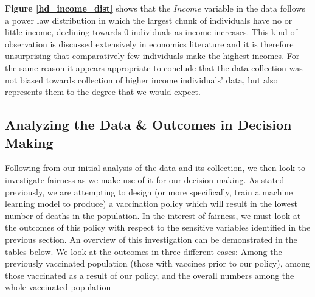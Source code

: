 \documentclass{article}
\begin{document}
\textbf{Figure \ref{hd_income_dist}} shows that the $Income$ variable in the data follows a power law distribution in which the largest chunk of individuals have no or little income, declining towards $0$ individuals as income increases. This kind of observation is discussed extensively in economics literature \textcolor{blue}{\cite{gabaix2016power}} and it is therefore unsurprising that comparatively few individuals make the highest incomes. For the same reason it appears appropriate to conclude that the data collection was not biased towards collection of higher income individuals' data, but also represents them to the degree that we would expect.



\subsection{Analyzing the Data \& Outcomes in Decision Making}

Following from our initial analysis of the data and its collection, we then look to investigate fairness as we make use of it for our decision making. As stated previously, we are attempting to design (or more specifically, train a machine learning model to produce) a vaccination policy which will result in the lowest number of deaths in the population. In the interest of fairness, we must look at the outcomes of this policy with respect to the sensitive variables identified in the previous section. An overview of this investigation can be demonstrated in the tables below. We look at the outcomes in three different cases: Among the previously vaccinated population (those with vaccines prior to our policy), among those vaccinated as a result of our policy, and the overall numbers among the whole vaccinated population
\end{document}
